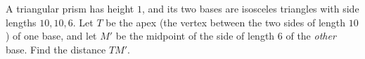 A triangular prism has height $1$, and its two bases are isosceles triangles with side lengths $10,10,6$. Let $T$ be the apex (the vertex between the two sides of length $10$) of one base, and let $M'$ be the midpoint of the side of length $6$ of the \emph{other} base. Find the distance $TM'$.
